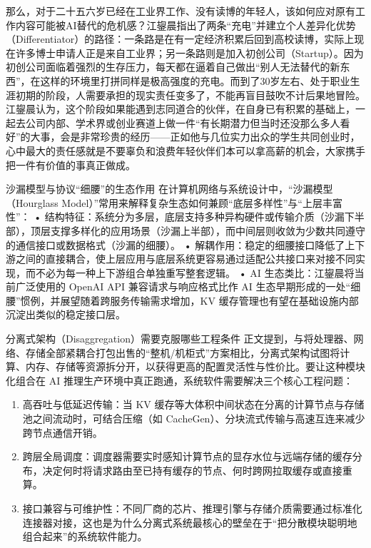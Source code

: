 \documentclass[UTF8,a4paper,11pt,fontset=fandol]{ctexart}
\begin{document}
那么，对于二十五六岁已经在工业界工作、没有读博的年轻人，该如何应对原有工作内容可能被AI替代的危机感？江鋆晨指出了两条“充电”并建立个人差异化优势（Differentiator）的路径：一条路是在有一定经济积累后回到高校读博，实际上现在许多博士申请人正是来自工业界；另一条路则是加入初创公司（Startup）。因为初创公司面临着强烈的生存压力，每天都在逼着自己做出“别人无法替代的新东西”，在这样的环境里打拼同样是极高强度的充电。而到了30岁左右、处于职业生涯初期的阶段，人需要承担的现实责任变多了，不能再盲目鼓吹不计后果地冒险。江鋆晨认为，这个阶段如果能遇到志同道合的伙伴，在自身已有积累的基础上，一起去公司内部、学术界或创业赛道上做一件“有长期潜力但当时还没那么多人看好”的大事，会是非常珍贵的经历——正如他与几位实力出众的学生共同创业时，心中最大的责任感就是不要辜负和浪费年轻伙伴们本可以拿高薪的机会，大家携手把一件有价值的事真正做成。

\begin{knowledgebox}{沙漏模型与协议“细腰”的生态作用}
在计算机网络与系统设计中，“沙漏模型（Hourglass Model）”常用来解释复杂生态如何兼顾“底层多样性”与“上层丰富性”：
• 结构特征：系统分为多层，底层支持多种异构硬件或传输介质（沙漏下半部），顶层支撑多样化的应用场景（沙漏上半部），而中间层则收敛为少数共同遵守的通信接口或数据格式（沙漏的细腰）。
• 解耦作用：稳定的细腰接口降低了上下游之间的直接耦合，使上层应用与底层系统更容易通过适配公共接口来对接不同实现，而不必为每一种上下游组合单独重写整套逻辑。
• AI 生态类比：江鋆晨将当前广泛使用的 OpenAI API 兼容请求与响应格式比作 AI 生态早期形成的一处“细腰”惯例，并展望随着跨服务传输需求增加，KV 缓存管理也有望在基础设施内部沉淀出类似的稳定接口层。
\end{knowledgebox}
\begin{warningbox}{分离式架构（Disaggregation）需要克服哪些工程条件}
正文提到，与将处理器、网络、存储全部紧耦合打包出售的“整机/机柜式”方案相比，分离式架构试图将计算、内存、存储等资源拆分开，以获得更高的配置灵活性与性价比。要让这种模块化组合在 AI 推理生产环境中真正跑通，系统软件需要解决三个核心工程问题：
\begin{enumerate}
\item 高吞吐与低延迟传输：当 KV 缓存等大体积中间状态在分离的计算节点与存储池之间流动时，可结合压缩（如 CacheGen）、分块流式传输与高速互连来减少跨节点通信开销。
\item 跨层全局调度：调度器需要实时感知计算节点的显存水位与远端存储的缓存分布，决定何时将请求路由至已持有缓存的节点、何时跨网拉取缓存或直接重算。
\item 接口兼容与可维护性：不同厂商的芯片、推理引擎与存储介质需要通过标准化连接器对接，这也是为什么分离式系统最核心的壁垒在于“把分散模块聪明地组合起来”的系统软件能力。
\end{enumerate}
\end{warningbox}
\end{document}
